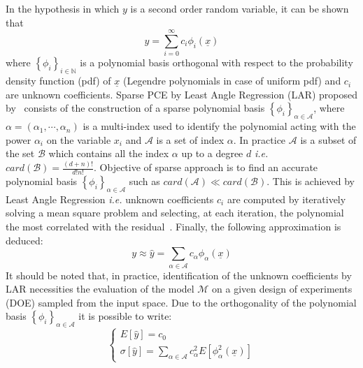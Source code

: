 In the hypothesis in which $y$ is a second order random variable, it can be shown that~\cite{bib:cameron}
\begin{equation}
\label{eq:y_polynome}
y = \sum_{i=0}^{\infty} c_i \phi_i(\underline{x}) 
\end{equation}
where $\left\lbrace \phi_i \right\rbrace_{i\in\mathbb{N}}$ is a polynomial basis orthogonal with respect to the probability density function (pdf) of $\underline{x}$ (Legendre polynomials in case of uniform pdf) and $c_i$ are unknown coefficients. 
Sparse PCE by Least Angle Regression (LAR) proposed by~\cite{bib:blatman_pce} consists of the construction of a sparse polynomial basis $\left\lbrace \phi_i \right\rbrace_{\alpha\in\mathcal{A}}$, where $\alpha=(\alpha_1,\cdots,\alpha_n)$ is a multi-index used to identify the polynomial acting with the power $\alpha_i$ on the variable $x_i$ and $\mathcal{A}$ is a set of index $\alpha$. 
In practice $\mathcal{A}$ is a subset of the set $\mathcal{B}$ which contains all the index $\alpha$ up to a degree $d$ \textit{i.e.} \hbox{$card(\mathcal{B})=\frac{(d+n)!}{d!n!}$}. Objective of sparse approach is to find an accurate polynomial basis $\left\lbrace \phi_i \right\rbrace_{\alpha\in\mathcal{A}}$ such as $card(\mathcal{A}) \ll card(\mathcal{B})$.
This is achieved by Least Angle Regression \textit{i.e.} unknown coefficients $c_i$ are computed by iteratively solving a mean square problem and selecting, at each iteration, the polynomial the most correlated with the residual~\cite{bib:blatman_pce}. Finally, the following approximation is deduced:
\begin{equation}
\label{eq:y_approx}
y\approx\hat{y} = \sum_{\alpha \in \mathcal{A}} c_\alpha \phi_\alpha(\underline{x})
\end{equation} 
It should be noted that, in practice, identification of the unknown coefficients by LAR necessities the evaluation of the model $\mathcal{M}$ on a given design of experiments (DOE) sampled from the input space.    
Due to the orthogonality of the polynomial basis $\left\lbrace \phi_i \right\rbrace_{\alpha\in\mathcal{A}}$ it is possible to write: 
\begin{equation}
\label{eq:e_var_y}
	\left\{\begin{array}{l}
		E\left[\hat{y}\right] = c_0 \\
		\sigma\left[\hat{y}\right] = \sum_{\alpha \in \mathcal{A}} c^2_{\alpha} E\left[\phi_{\alpha}^2\left(\underline{x}\right)\right]
	\end{array}\right.
\end{equation}
